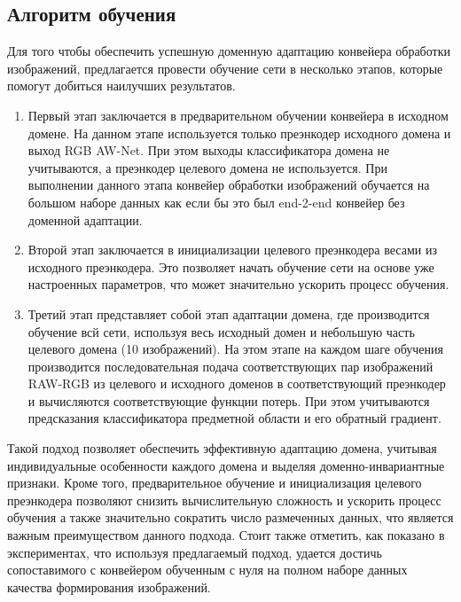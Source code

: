 \subsection{Алгоритм обучения}\label{sect-4-2}

Для того чтобы обеспечить успешную доменную адаптацию конвейера обработки изображений, предлагается провести обучение сети в несколько этапов, которые помогут добиться наилучших результатов.

\begin{enumerate}
    \item Первый этап заключается в предварительном обучении конвейера в исходном домене. На данном этапе используется только преэнкодер исходного домена и выход RGB AW-Net. При этом выходы классификатора домена не учитываются, а преэнкодер целевого домена не используется. При выполнении данного этапа конвейер обработки изображений обучается на большом наборе данных как если бы это был end-2-end конвейер без доменной адаптации.
    \item Второй этап заключается в инициализации целевого преэнкодера весами из исходного преэнкодера. Это позволяет начать обучение сети на основе уже настроенных параметров, что может значительно ускорить процесс обучения.
    \item Третий этап представляет собой этап адаптации домена, где производится обучение всй сети, используя весь исходный домен и небольшую часть целевого домена (10 изображений). На этом этапе на каждом шаге обучения производится последовательная подача соответствующих пар изображений RAW-RGB из целевого и исходного доменов в соответствующий преэнкодер и вычисляются соответствующие функции потерь. При этом учитываются предсказания классификатора предметной области и его обратный градиент.
\end{enumerate}

Такой подход позволяет обеспечить эффективную адаптацию домена, учитывая индивидуальные особенности каждого домена и выделяя доменно-инвариантные признаки. Кроме того, предварительное обучение и инициализация целевого преэнкодера позволяют снизить вычислительную сложность и ускорить процесс обучения а также значительно сократить число размеченных данных, что является важным преимуществом данного подхода. Стоит также отметить, как показано в экспериментах, что используя предлагаемый подход, удается достичь сопоставимого с конвейером обученным с нуля на полном наборе данных качества формирования изображений.

